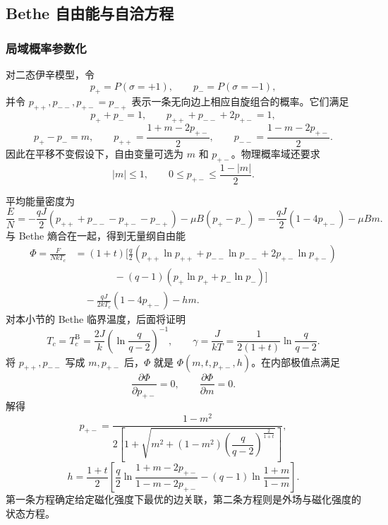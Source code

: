 \subsection{Bethe 自由能与自洽方程}

\subsubsection{局域概率参数化}

对二态伊辛模型，令
\begin{equation*}
	p_+=P(\sigma=+1),\qquad p_-=P(\sigma=-1),
\end{equation*}
并令 \(p_{++},p_{--},p_{+-}=p_{-+}\) 表示一条无向边上相应自旋组合的概率。它们满足
\begin{equation*}
	p_++p_-=1,\qquad
	p_{++}+p_{--}+2p_{+-}=1,
\end{equation*}
\begin{equation*}
	p_+-p_-=m,\qquad
	p_{++}=\frac{1+m-2p_{+-}}2,\qquad
	p_{--}=\frac{1-m-2p_{+-}}2.
\end{equation*}
因此在平移不变假设下，自由变量可选为 \(m\) 和 \(p_{+-}\)。物理概率域还要求
\[
	|m|\leq1,\qquad
	0\leq p_{+-}\leq\frac{1-|m|}{2}.
\]

平均能量密度为
\begin{equation*}
	\frac EN
	=-\frac{qJ}{2}
	\left(p_{++}+p_{--}-p_{+-}-p_{-+}\right)
	-\mu B(p_+-p_-)
	=-\frac{qJ}{2}\left(1-4p_{+-}\right)-\mu Bm .
\end{equation*}
与 Bethe 熵合在一起，得到无量纲自由能
\begin{align*}
	\Phi=\frac{F}{NkT_c}
	&=(1+t)\Bigg[
	\frac q2\left(
	p_{++}\ln p_{++}+p_{--}\ln p_{--}+2p_{+-}\ln p_{+-}\right)\\
	&\qquad\qquad
	-(q-1)\left(
	p_+\ln p_++p_-\ln p_-\right)\Bigg]\\
	&\quad-\frac{qJ}{2kT_c}(1-4p_{+-})-hm .
\end{align*}
对本小节的 Bethe 临界温度，后面将证明
\begin{equation*}
	T_c=T_c^{\mathrm B}
	=\frac{2J}{k}\left(\ln\frac{q}{q-2}\right)^{-1},
\qquad
\gamma=\frac{J}{kT}
	=\frac{1}{2(1+t)}\ln\frac{q}{q-2}.
\end{equation*}
将 \(p_{++},p_{--}\) 写成 \(m,p_{+-}\) 后，\(\Phi\) 就是 \(\Phi(m,t,p_{+-},h)\)。在内部极值点满足
\begin{equation*}
	\frac{\partial\Phi}{\partial p_{+-}}=0,\qquad
	\frac{\partial\Phi}{\partial m}=0.
\end{equation*}
解得
\begin{equation*}
	p_{+-}
	=\frac{1-m^2}
	{2\left[1+\sqrt{m^2+(1-m^2)
	\left(\dfrac q{q-2}\right)^{\frac{2}{1+t}}}\right]},
\end{equation*}
\begin{equation*}
	h=\frac{1+t}{2}\left[
	\frac q2\ln\frac{1+m-2p_{+-}}{1-m-2p_{+-}}
	-(q-1)\ln\frac{1+m}{1-m}\right].
\end{equation*}
第一条方程确定给定磁化强度下最优的边关联，第二条方程则是外场与磁化强度的状态方程。

